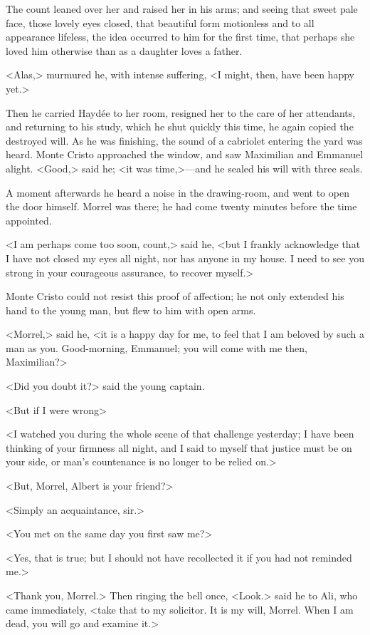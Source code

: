  The count leaned over her and raised her in his arms; and seeing that sweet pale face, those lovely eyes closed, that beautiful form motionless and to all appearance lifeless, the idea occurred to him for the first time, that perhaps she loved him otherwise than as a daughter loves a father. 

 <Alas,> murmured he, with intense suffering, <I might, then, have been happy yet.> 

 Then he carried Haydée to her room, resigned her to the care of her attendants, and returning to his study, which he shut quickly this time, he again copied the destroyed will. As he was finishing, the sound of a cabriolet entering the yard was heard. Monte Cristo approached the window, and saw Maximilian and Emmanuel alight. <Good,> said he; <it was time,>—and he sealed his will with three seals. 

 A moment afterwards he heard a noise in the drawing-room, and went to open the door himself. Morrel was there; he had come twenty minutes before the time appointed. 

 <I am perhaps come too soon, count,> said he, <but I frankly acknowledge that I have not closed my eyes all night, nor has anyone in my house. I need to see you strong in your courageous assurance, to recover myself.> 

 Monte Cristo could not resist this proof of affection; he not only extended his hand to the young man, but flew to him with open arms. 

 <Morrel,> said he, <it is a happy day for me, to feel that I am beloved by such a man as you. Good-morning, Emmanuel; you will come with me then, Maximilian?> 

 <Did you doubt it?> said the young captain. 

 <But if I were wrong\longdash> 

 <I watched you during the whole scene of that challenge yesterday; I have been thinking of your firmness all night, and I said to myself that justice must be on your side, or man's countenance is no longer to be relied on.> 

 <But, Morrel, Albert is your friend?> 

 <Simply an acquaintance, sir.> 

 <You met on the same day you first saw me?> 

 <Yes, that is true; but I should not have recollected it if you had not reminded me.> 

 <Thank you, Morrel.> Then ringing the bell once, <Look.> said he to Ali, who came immediately, <take that to my solicitor. It is my will, Morrel. When I am dead, you will go and examine it.> 

